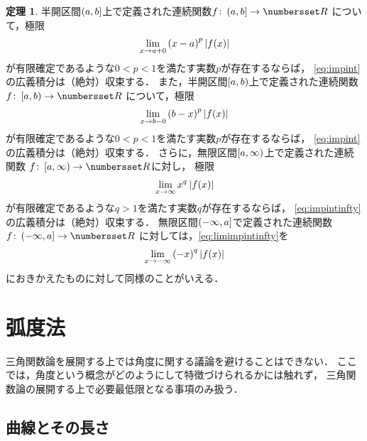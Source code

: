 \documentclass[11pt,a4paper]{ltjsarticle}
\newcommand*{\maparrow}{\rightarrow}
\theoremstyle{definition}
\newtheorem{thm}[dfn]{定理}
\begin{document}
\begin{thm} \label{thm:impintconv}
  半開区間$\interval{lop}{a,b}$上で定義された連続関数$f \colon \interval{lop}{a,b} \maparrow \Real$
  について，極限
  \begin{align}
    \lim_{x \to a+0} \paren{x - a}^p \absolute{\apply{f}{x}}
    \label{eq:limimpint}
  \end{align}
  が有限確定であるような$0 < p < 1$を満たす実数$p$が存在するならば，
  \cref{eq:impint}の広義積分は（絶対）収束する．
  また，半開区間$\interval{rop}{a,b}$上で定義された連続関数$f \colon \interval{rop}{a,b} \maparrow \Real$
  について，極限
  \begin{align}
    \lim_{x \to b - 0} \paren{b - x}^p \absolute{\apply{f}{x}}
    \label{eq:limimpint2}
  \end{align}
  が有限確定であるような$0 < p < 1$を満たす実数$p$が存在するならば，
  \cref{eq:impint}の広義積分は（絶対）収束する．
  さらに，無限区間$\interval{rop}{a, \infty}$上で定義された連続関数
  $f \colon \interval{rop}{a, \infty} \maparrow \Real$に対し，
  極限
  \begin{align}
    \lim_{x \to \infty} x^q \absolute{\apply{f}{x}}
    \label{eq:limimpintinfty}
  \end{align}
  が有限確定であるような$q > 1$を満たす実数$q$が存在するならば，
  \cref{eq:impintinfty}の広義積分は（絶対）収束する．
  無限区間$\interval{lop}{- \infty, a}$で定義された連続関数$f \colon \interval{lop}{-\infty , a} \maparrow \Real$
  に対しては，\cref{eq:limimpintinfty}を
  \begin{align}
    \lim_{x \to - \infty} \paren{-x}^q \absolute{\apply{f}{x}}
    \label{eq:limintminusinfty}
  \end{align}
  におきかえたものに対して同様のことがいえる．
\end{thm}


\section{弧度法}


三角関数論を展開する上では角度に関する議論を避けることはできない．
ここでは，角度という概念がどのようにして特徴づけられるかには触れず，
三角関数論の展開する上で必要最低限となる事項のみ扱う．


\subsection{曲線とその長さ} \label{subsec:curvelength}
\end{document}
